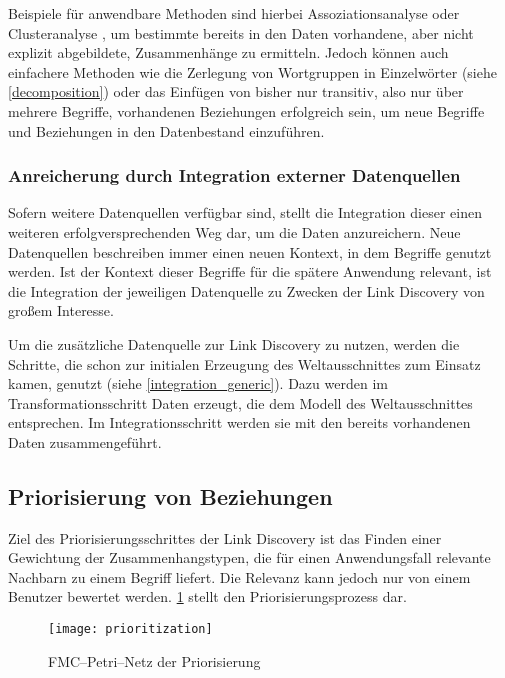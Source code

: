 Beispiele für anwendbare Methoden sind hierbei Assoziationsanalyse \cite[S. 328f.]{pt2013} oder Clusteranalyse \cite[S. 443f.]{hkp2012}, um bestimmte bereits in den Daten vorhandene, aber nicht explizit abgebildete, Zusammenhänge zu ermitteln. Jedoch können auch einfachere Methoden wie die Zerlegung von Wortgruppen in Einzelwörter (siehe \cref{decomposition}) oder das Einfügen von bisher nur transitiv, also nur über mehrere Begriffe, vorhandenen Beziehungen erfolgreich sein, um neue Begriffe und Beziehungen in den Datenbestand einzuführen.

\subsubsection{Anreicherung durch Integration externer Datenquellen}
\label{enrichment_external}

Sofern weitere Datenquellen verfügbar sind, stellt die Integration dieser einen weiteren erfolgversprechenden Weg dar, um die Daten anzureichern. Neue Datenquellen beschreiben immer einen neuen Kontext, in dem Begriffe genutzt werden. Ist der Kontext dieser Begriffe für die spätere Anwendung relevant, ist die Integration der jeweiligen Datenquelle zu Zwecken der Link Discovery von großem Interesse.

Um die zusätzliche Datenquelle zur Link Discovery zu nutzen, werden die Schritte, die schon zur initialen Erzeugung des Weltausschnittes zum Einsatz kamen, genutzt (siehe \cref{integration_generic}). Dazu werden im Transformationsschritt Daten erzeugt, die dem Modell des Weltausschnittes entsprechen. Im Integrationsschritt werden sie mit den bereits vorhandenen Daten zusammengeführt.

\subsection{Priorisierung von Beziehungen}
\label{prioritization}

Ziel des Priorisierungsschrittes der Link Discovery ist das Finden einer Gewichtung der Zusammenhangstypen, die für einen Anwendungsfall relevante Nachbarn zu einem Begriff liefert. Die Relevanz kann jedoch nur von einem Benutzer bewertet werden. \cref{fig:prioritization} stellt den Priorisierungsprozess dar.

\begin{figure}
\centering
\texttt{[image: prioritization]}
\caption{FMC--Petri--Netz der Priorisierung}
\label{fig:prioritization}
\end{figure}

